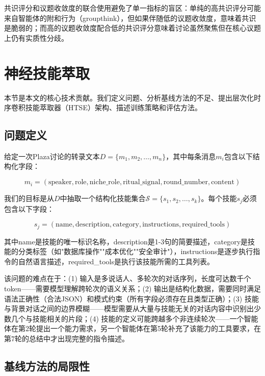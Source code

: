 \documentclass[conference]{IEEEtran}
\begin{document}
共识评分和议题收敛度的联合使用避免了单一指标的盲区：单纯的高共识评分可能来自智能体的附和行为（groupthink），但如果伴随低的议题收敛度，意味着共识是脆弱的；而高的议题收敛度配合低的共识评分意味着讨论虽然聚焦但在核心议题上仍有实质性分歧。

\section{神经技能萃取}

本节是本文的核心技术贡献。我们定义问题、分析基线方法的不足、提出层次化时序卷积技能萃取器（HTSE）架构、描述训练策略和评估方法。

\subsection{问题定义}

给定一次Plaza讨论的转录文本$D = \{m_1, m_2, \ldots, m_n\}$，其中每条消息$m_i$包含以下结构化字段：

\begin{equation}
m_i = (\text{speaker}, \text{role}, \text{niche\_role}, \text{ritual\_signal}, \text{round\_number}, \text{content})
\label{eq:message}
\end{equation}

我们的目标是从$D$中抽取一个结构化技能集合$\mathcal{S} = \{s_1, s_2, \ldots, s_k\}$。每个技能$s_j$必须包含以下字段：

\begin{equation}
s_j = (\text{name}, \text{description}, \text{category}, \text{instructions}, \text{required\_tools})
\label{eq:skill_struct}
\end{equation}

其中name是技能的唯一标识名称，description是1-3句的简要描述，category是技能的分类标签（如"数据库操作""成本优化""安全审计"），instructions是逐步执行指令的自然语言描述，required\_tools是执行该技能所需的工具列表。

该问题的难点在于：(1) 输入是多说话人、多轮次的对话序列，长度可达数千个token——需要模型理解跨轮次的语义关系；(2) 输出是结构化数据，需要同时满足语法正确性（合法JSON）和模式约束（所有字段必须存在且类型正确）；(3) 技能与背景对话之间的边界模糊——模型需要从大量与技能无关的对话内容中识别出少数几个与技能相关的片段；(4) 技能的定义可能跨越多个非连续轮次——一个智能体在第2轮提出一个能力需求，另一个智能体在第5轮补充了该能力的工具要求，在第7轮的总结中才出现完整的指令描述。

\subsection{基线方法的局限性}
\end{document}
